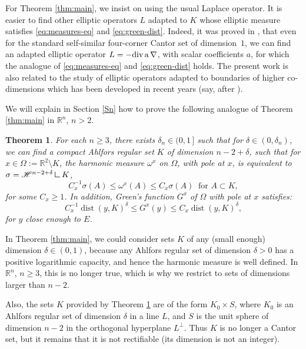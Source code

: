 \documentclass[10pt]{amsart}
\let\sm\setminus
\numberwithin{equation}{section}
\theoremstyle{plain}
\newtheorem{thm}[lem]{Theorem}
\theoremstyle{definition}
\newcommand{\R}{\mathbb{R}}
\DeclareMathOperator{\dist}{dist}
\newcommand{\mres}{\mathbin{\vrule height 1.6ex depth 0pt width
0.13ex\vrule height 0.13ex depth 0pt width 1.3ex}}
\begin{document}
For Theorem \ref{thm:main}, we insist on using the usual Laplace operator. It is easier to find other elliptic operators $L$ adapted to $K$ whose elliptic measure
satisfies \eqref{eq:measures-eq} and \eqref{eq:green-dist}.
Indeed, it was proved in \cite{DavidMayboroda-good}, that even
for the standard self-similar four-corner Cantor set of dimension~$1$,
we can find an adapted elliptic operator
$L= -\rm{div} \, a \, \nabla$, with scalar coefficients $a$,
for which the analogue of \eqref{eq:measures-eq} and \eqref{eq:green-dist} holds.
The present work is also related to the study of elliptic operators adapted to boundaries of
higher co-dimensions which has been developed in recent years (say, after \cite{DFM-Memoirs}).

We will explain in Section \ref{Sn} how to prove the following analogue of
Theorem \ref{thm:main} in $\R^n$, $n > 2$.

\begin{thm}\label{thm:main2}
For each $n \geq 3$, there exists $\delta_n\in (0,1\,]$ such that for $\delta\in (0,\delta_n)$,
we can find a compact Ahlfors regular set $K$ of dimension $n-2+\delta$,
such that for $x\in \Omega := \R^2 \sm K$,
the harmonic measure $\omega^x$ on $\Omega$, with pole at $x$, is
equivalent to $\sigma = \mathscr{H}^{n-2+\delta} \mres K$, \ie
\begin{equation} \label{eq:measures-eq2}
C_x^{-1} \sigma(A) \leq \omega^x(A) \leq C_x \sigma(A)
\ \text{ for } A\subset K,
\end{equation}
for some $C_x \geq 1$.
In addition, Green's function $G^x$ of $\Omega$ with pole at $x$ satisfies:
\begin{equation}\label{eq:green-dist2}
C_x^{-1} \dist(y,K)^\delta \leq G^x(y) \leq C_x \dist(y,K)^\delta,
\end{equation}
for $y$ close enough to $E$.
\end{thm}

In Theorem \ref{thm:main}, we could consider sets $K$ of any (small enough)
dimension $\delta \in (0,1)$, because any Ahlfors regular set of dimension $\delta > 0$ has a
positive logarithmic capacity, and hence the harmonic measure is well defined.
In $\R^n$, $n \geq 3$, this is no longer true,
which is why we restrict to sets of dimensions larger than $n-2$.

Also, the sets $K$ provided by Theorem \ref{thm:main2}
are of the form $K_0 \times S$, where $K_0$ is an Ahlfors regular set of dimension $\delta$ in a line $L$,
and $S$ is the unit sphere of dimension $n-2$ in the orthogonal hyperplane $L^\perp$. Thus $K$ is
no longer a Cantor set, but it remains that it is not rectifiable (its dimension is not an integer).
\end{document}

